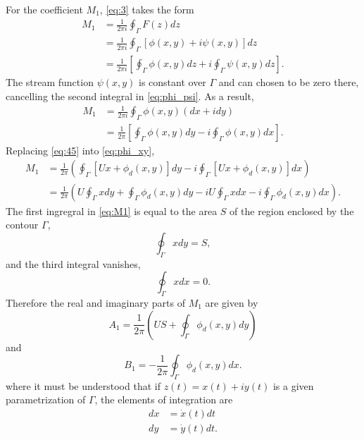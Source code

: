 \documentclass[11pt]{article}
\begin{document}
For the coefficient $M_1$, \eqref{eq:3} takes the form
\begin{align}
  \label{eq:5}
  M_1 &= \frac{1}{2\pi i} \oint_\Gamma F(z) dz \\
      &=\frac{1}{2\pi i} \oint_\Gamma \left[\phi(x,y) + i\psi(x,y)\right]dz \\
      &=\frac{1}{2\pi i} \left[\oint_\Gamma \phi(x,y)dz + i\oint_\Gamma \psi(x,y)dz \right].\label{eq:phi_psi}
\end{align}
The stream function $\psi(x,y)$ is constant over $\Gamma$ and can chosen to be zero there, cancelling the second integral in \eqref{eq:phi_psi}. As a result,
\begin{align}
  \label{eq:7}
  M_1 &= \frac{1}{2\pi i}\oint_\Gamma \phi(x,y)(dx + i dy)\\
  &= \frac{1}{2\pi}\left[\oint_\Gamma \phi(x,y) dy -
    i\oint_\Gamma \phi(x,y) dx \right].\label{eq:phi_xy}
\end{align}
Replacing \eqref{eq:45} into \eqref{eq:phi_xy},
\begin{align}
  M_1 &= \frac{1}{2\pi}\left(\oint_\Gamma [U x + \phi_d(x,y)]dy -
        i\oint_\Gamma [U x + \phi_d(x,y)]dx \right) \\
  &= \frac{1}{2\pi}\left(U\oint_\Gamma  x dy + \oint_\Gamma  \phi_d(x,y) dy -i U\oint_\Gamma  x dx -i \oint_\Gamma \phi_d(x,y) dx \right).\label{eq:M1}
\end{align}
The first ingregral in \eqref{eq:M1} is equal to the area $S$ of the region enclosed by the contour $\Gamma$,
\begin{equation}
  \label{eq:10}
  \oint_\Gamma xdy = S,
\end{equation}
and the third integral vanishes,
\begin{equation}
  \label{eq:8}
  \oint_\Gamma x dx = 0.
\end{equation}
Therefore the real and imaginary parts of $M_1$ are given by
\begin{equation}
  \label{eq:9}
  A_1 = \frac{1}{2\pi}\left(U S + \oint_\Gamma \phi_d(x,y)dy \right)
  \end{equation}
  and
  \begin{equation}
    \label{eq:11}
    B_1 = -\frac{1}{2\pi}\oint_\Gamma \phi_d(x,y)dx.
  \end{equation}
  where it must be understood that if $z(t) = x(t) + i y(t)$ is a given parametrization of $\Gamma$, the elements of integration are
    \begin{align}
    \label{eq:12}
    dx &= \dot{x}(t) dt \\
    dy &= \dot{y}(t) dt.
    \end{align}
\end{document}
